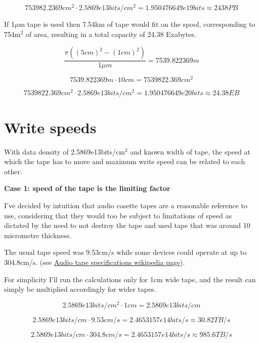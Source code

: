 \documentclass[a4paper]{article}
\begin{document}
	$$ 753982.2369 cm^2 \cdot 2.5869e13bits/cm^2 = 1.950476649e19 bits \approx 2438PB $$
	
	\vfill
	
	If 1$\mu$m tape is used then 7.54km of tape would fit on the spool, corresponding to 754m$^2$ of area, resulting in a total capacity of 24.38 Exabytes.
	
	$$ \frac{\pi ((5cm)^2 - (1cm)^2)}{1\mu m} = 7539.822369 m $$
	
	$$ 7539.822369 m \cdot 10cm =  7539822.369 cm^2 $$
	
	$$ 7539822.369 cm^2 \cdot 2.5869e13bits/cm^2 = 1.950476649e20 bits \approx 24.38EB $$
	
	\pagebreak
	
	\section{Write speeds}
	
	With data density of 2.5869e13bits/cm$^2$ and known width of tape, the speed at which the tape has to move and maximum write speed can be related to each other.
	
	\medskip
	
	\begin{center}
		\textbf{Case 1: speed of the tape is the limiting factor}
	\end{center}
	
	\medskip
	
	I've decided by intuition that audio casette tapes are a reasonable reference to use, considering that they would too be subject to limitations of speed as dictated by the need to not destroy the tape and used tape that was around 10 micrometre thickness.
	
	\medskip
	
	The usual tape speed was 9.53cm/s while some devices could operate at up to 304.8cm/s. (see \href{https://en.wikipedia.org/wiki/Audio_tape_specifications#Tape_speeds}{Audio tape specifications wikipedia page}).
	
	\medskip
	
	For simplicity I'll run the calculations only for 1cm wide tape, and the result can simply be multiplied accordingly for wider tapes.
	
	$$ 2.5869e13bits/cm^2 \cdot 1cm = 2.5869e13 bits/cm $$
	
	$$ 2.5869e13 bits/cm \cdot  9.53cm/s = 2.4653157e14bits/s \approx 30.82TB/s $$
	
	$$ 2.5869e13 bits/cm \cdot  304.8cm/s = 2.4653157e14bits/s \approx 985.6TB/s $$
	
\end{document}
